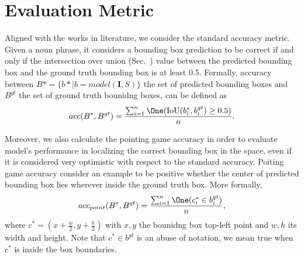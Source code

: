 \section{Evaluation Metric}
\label{sec:evaluation-metric}

Aligned with the works in literature, we consider the standard
accuracy metric. Given a noun phrase, it considers a bounding box
prediction to be correct if and only if the intersection over union
(Sec.~) value between the predicted bounding box and
the ground truth bounding box is at least 0.5. Formally, accuracy between $B* = \{ b* | b = model(\bm{I}, S) \}$ the set of predicted bounding boxes and $B^{gt}$ the set of ground truth bounidng boxes, can be defined as
\[
  acc(B^*, B^{gt}) = \frac{\sum_{i = 1}^{n} \One (\iou (b_i^*, b_i^{gt}) \geq 0.5)}{n}.
\]

Moreover, we also calculate the pointing game accuracy in order to
evaluate model's performance in localizing the correct bounding box in
the space, even if it is considered very optimistic with respect to
the standard accuracy. Poiting game accuracy consider an example to be
positive whether the center of predicted bounding box lies wherever
inside the ground truth box. More formally,
\[
  acc_{point}(B^*, B^{gt}) = \frac{\sum_{i = 1}^{n} \One (c_i^* \in  b_i^{gt})}{n},
\]
where $c^* = (x + \frac{w}{2}, y + \frac{h}{2})$ with $x, y$ the
bounidng box top-left point and $w, h$ its width and height. Note that
$c^* \in b^{gt}$ is an abuse of notation, we mean true when $c^*$ is
inside the box boundaries.